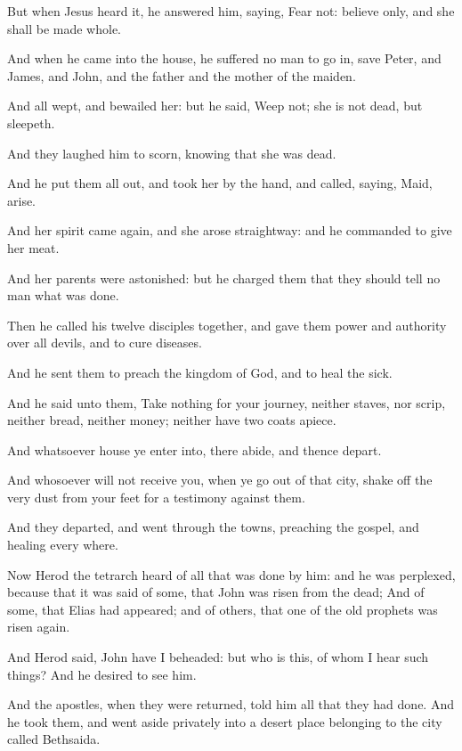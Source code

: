 \Verse But when Jesus heard it, he answered him, saying, Fear not: believe only, and she shall be made whole.

\Verse And when he came into the house, he suffered no man to go in, save Peter, and James, and John, and the father and the mother of the maiden.

\Verse And all wept, and bewailed her: but he said, Weep not; she is not dead, but sleepeth.

\Verse And they laughed him to scorn, knowing that she was dead.

\Verse And he put them all out, and took her by the hand, and called, saying, Maid, arise.

\Verse And her spirit came again, and she arose straightway: and he commanded to give her meat.

\Verse And her parents were astonished: but he charged them that they should tell no man what was done.


\Chapter
\Verse Then he called his twelve disciples together, and gave them power and authority over all devils, and to cure diseases.

\Verse And he sent them to preach the kingdom of God, and to heal the sick.

\Verse And he said unto them, Take nothing for your journey, neither staves, nor scrip, neither bread, neither money; neither have two coats apiece.

\Verse And whatsoever house ye enter into, there abide, and thence depart.

\Verse And whosoever will not receive you, when ye go out of that city, shake off the very dust from your feet for a testimony against them.

\Verse And they departed, and went through the towns, preaching the gospel, and healing every where.

\Verse Now Herod the tetrarch heard of all that was done by him: and he was perplexed, because that it was said of some, that John was risen from the dead; \Verse And of some, that Elias had appeared; and of others, that one of the old prophets was risen again.

\Verse And Herod said, John have I beheaded: but who is this, of whom I hear such things? And he desired to see him.

\Verse And the apostles, when they were returned, told him all that they had done. And he took them, and went aside privately into a desert place belonging to the city called Bethsaida.


